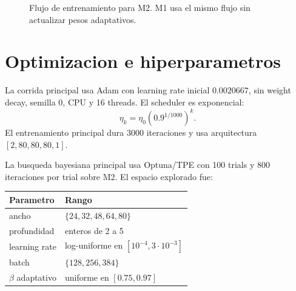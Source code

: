\documentclass[11pt,a4paper]{article}
\begin{document}
\begin{figure}[H]
\centering
{}
\caption{Flujo de entrenamiento para M2. M1 usa el mismo flujo sin actualizar
pesos adaptativos.}
\end{figure}

\section{Optimizacion e hiperparametros}

La corrida principal usa Adam con learning rate inicial $0.0020667$, sin
weight decay, semilla 0, CPU y 16 threads. El scheduler es exponencial:
\begin{equation}
  \eta_k=\eta_0\left(0.9^{1/1000}\right)^k.
\end{equation}
El entrenamiento principal dura 3000 iteraciones y usa arquitectura
$[2,80,80,80,1]$.

La busqueda bayesiana principal usa Optuna/TPE con 100 trials y 800 iteraciones
por trial sobre M2. El espacio explorado fue:
\begin{center}
\begin{tabular}{ll}
\toprule
Parametro & Rango \\
\midrule
ancho & $\{24,32,48,64,80\}$ \\
profundidad & enteros de 2 a 5 \\
learning rate & log-uniforme en $[10^{-4},3\cdot 10^{-3}]$ \\
batch & $\{128,256,384\}$ \\
$\beta$ adaptativo & uniforme en $[0.75,0.97]$ \\
\bottomrule
\end{tabular}
\end{center}
\end{document}
